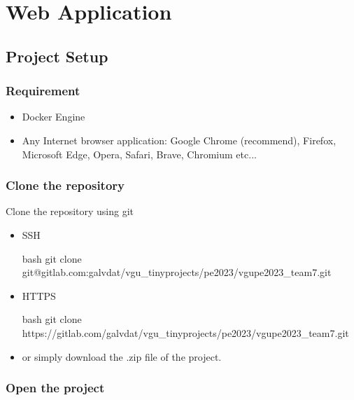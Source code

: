 \section{Web Application}

\subsection{Project Setup}

\subsubsection{Requirement}
\begin{itemize}
    \item Docker Engine 
    \item Any Internet browser application: Google Chrome (recommend), Firefox, Microsoft Edge, Opera, Safari, Brave, Chromium etc...
\end{itemize}

\subsubsection{Clone the repository}
Clone the repository using git

\begin{itemize}
    \item SSH
          \begin{code}{bash}
            git clone git@gitlab.com:galvdat/vgu_tinyprojects/pe2023/vgupe2023_team7.git
          \end{code}
          
    \item HTTPS
          \begin{code}{bash}
            git clone https://gitlab.com/galvdat/vgu_tinyprojects/pe2023/vgupe2023_team7.git
          \end{code}

    \item or simply download the .zip file of the project.
\end{itemize}

\subsubsection{Open the project}

